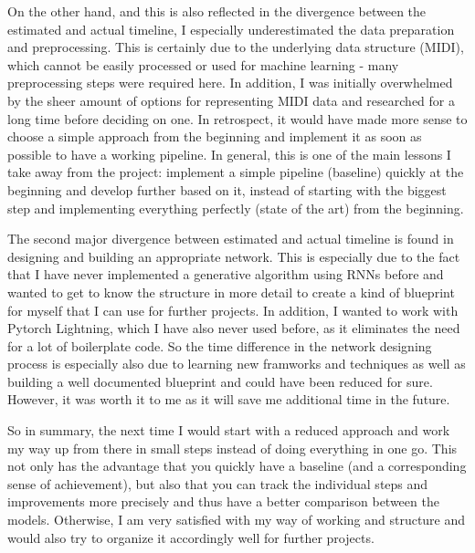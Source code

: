 \documentclass[a4paper, 10pt, xcolor=dvipsnames]{article} %
\begin{document}
On the other hand, and this is also reflected in the divergence between the
estimated and actual timeline, I especially underestimated the data preparation
and preprocessing. This is certainly due to the underlying data structure
(MIDI), which cannot be easily processed or used for machine learning - many
preprocessing steps were required here. In addition, I was initially
overwhelmed by the sheer amount of options for representing MIDI data and
researched for a long time before deciding on one. In retrospect, it would have
made more sense to choose a simple approach from the beginning and implement it
as soon as possible to have a working pipeline. In general, this is one of the
main lessons I take away from the project: implement a simple pipeline
(baseline) quickly at the beginning and develop further based on it, instead of
starting with the biggest step and implementing everything perfectly (state of
the art) from the beginning.

The second major divergence between estimated and actual timeline is found in
designing and building an appropriate network. This is especially due to the
fact that I have never implemented a generative algorithm using RNNs before and
wanted to get to know the structure in more detail to create a kind of
blueprint for myself that I can use for further projects. In addition, I wanted
to work with Pytorch Lightning, which I have also never used before, as it
eliminates the need for a lot of boilerplate code. So the time difference in
the network designing process is especially also due to learning new framworks
and techniques as well as building a well documented blueprint and could have
been reduced for sure. However, it was worth it to me as it will save me
additional time in the future.

So in summary, the next time I would start with a reduced approach and work my
way up from there in small steps instead of doing everything in one go. This
not only has the advantage that you quickly have a baseline (and a
corresponding sense of achievement), but also that you can track the individual
steps and improvements more precisely and thus have a better comparison between
the models. Otherwise, I am very satisfied with my way of working and structure
and would also try to organize it accordingly well for further projects.



\end{document}
